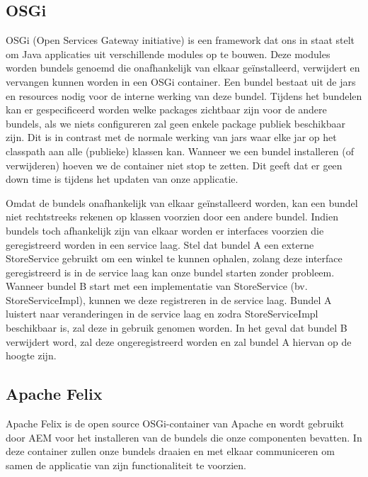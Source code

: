 \documentclass{article}
\begin{document}
	\subsection{OSGi}
	OSGi (Open Services Gateway initiative) is een framework dat ons in staat stelt om Java applicaties uit verschillende modules op te bouwen. Deze modules worden bundels genoemd die onafhankelijk van elkaar geïnstalleerd, verwijdert en vervangen kunnen worden in een OSGi container. Een bundel bestaat uit de jars en resources nodig voor de interne werking van deze bundel. Tijdens het bundelen kan er gespecificeerd worden welke packages zichtbaar zijn voor de andere bundels, als we niets configureren zal geen enkele package publiek beschikbaar zijn. Dit is in contrast met de normale werking van jars waar elke jar op het classpath aan alle (publieke) klassen kan. Wanneer we een bundel installeren (of verwijderen) hoeven we de container niet stop te zetten. Dit geeft dat er geen down time is tijdens het updaten van onze applicatie.
	\par
	Omdat de bundels onafhankelijk van elkaar geïnstalleerd worden, kan een bundel niet rechtstreeks rekenen op klassen voorzien door een andere bundel. Indien bundels toch afhankelijk zijn van elkaar worden er interfaces voorzien die geregistreerd worden in een service laag. Stel dat bundel A een externe StoreService gebruikt om een winkel te kunnen ophalen, zolang deze interface geregistreerd is in de service laag kan onze bundel starten zonder probleem. Wanneer bundel B start met een implementatie van StoreService (bv. StoreServiceImpl), kunnen we deze registreren in de service laag. Bundel A luistert naar veranderingen in de service laag en zodra StoreServiceImpl beschikbaar is, zal deze in gebruik genomen worden. In het geval dat bundel B verwijdert word, zal deze ongeregistreerd worden en zal bundel A hiervan op de hoogte zijn.
	\subsection{Apache Felix}
	Apache Felix is de open source OSGi-container van Apache en wordt gebruikt door AEM voor het installeren van de bundels die onze componenten bevatten. In deze container zullen onze bundels draaien en met elkaar communiceren om samen de applicatie van zijn functionaliteit te voorzien.
\end{document}
